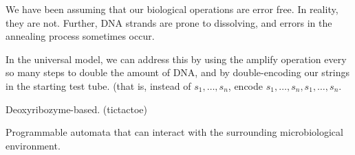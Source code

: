 \documentclass{beamer}
\begin{document}



We have been assuming that our biological operations are error free. In reality, they are not. Further, DNA strands are prone to dissolving, and errors in the annealing process sometimes occur.

In the universal model, we can address this by using the amplify operation every so many steps to double the amount of DNA, and by double-encoding our strings in the starting test tube. (that is, instead of $s_1,\ldots,s_n$, encode $s_1,\ldots,s_n,s_1,\ldots,s_n$.



Deoxyribozyme-based. (tictactoe)

Programmable automata that can interact with the surrounding microbiological environment.
\end{document}
